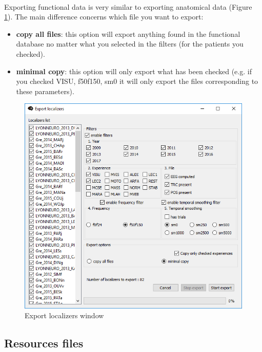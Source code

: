 \documentclass[a4paper]{article}
\begin{document}
\paragraph{} Exporting functional data is very similar to exporting anatomical data (Figure \ref{dbManagerExportLoca}). The main difference concerns which file you want to export:
\begin{itemize}
\item \textbf{copy all files}: this option will export anything found in the functional database no matter what you selected in the filters (for the patients you checked).
\item \textbf{minimal copy}: this option will only export what has been checked (e.g. if you checked VISU, f50f150, sm0 it will only export the files corresponding to these parameters).
\end{itemize}
\begin{figure}[H]
\begin{center}
\includegraphics[scale=0.5]{ExportLoca.png}
\end{center}
\caption{\label{dbManagerExportLoca}Export localizers window}
\end{figure}
\subsection{Resources files}
\end{document}
